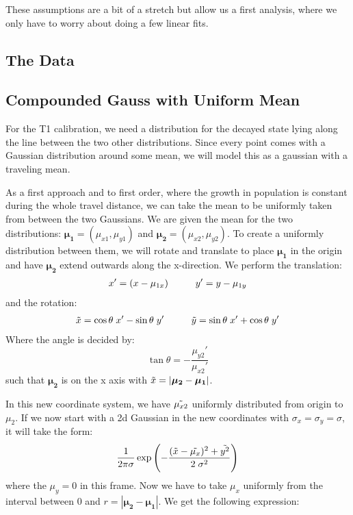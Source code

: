 These assumptions are a bit of a stretch but allow us a first analysis, where we only have to worry about doing a few linear fits.

\subsection{The Data}



\subsection{Compounded Gauss with Uniform Mean}
For the T1 calibration, we need a distribution for the decayed state lying along the line between the two other distributions. Since every point comes with a Gaussian distribution around some mean, we will model this as a gaussian with a traveling mean.

As a first approach and to first order, where the growth in population is constant during the whole travel distance, we can take the mean to be uniformly taken from between the two Gaussians. We are given the mean for the two distributions: $\boldsymbol{\mu_1} = (\mu_{x1}, \mu_{y1})$ and $\boldsymbol{\mu_2} = (\mu_{x2}, \mu_{y2})$. To create a uniformly distribution between them, we will rotate and translate to place $\boldsymbol{\mu_1}$ in the origin and have $\boldsymbol{\mu_2}$ extend outwards along the x-direction. We perform the translation:
\begin{align*}
    x' = (x - \mu_{1x}) \hspace{1 cm} y' = y - \mu_{1y}
\end{align*}
and the rotation:
\begin{align*}
    \Tilde{x} = \cos\theta \; x' - \sin\theta \; y' \hspace{1cm} \Tilde{y} =  \sin\theta \; x' + \cos\theta \; y' 
\end{align*}
Where the angle is decided by:
\begin{equation}
    \tan \theta = - \frac{\mu_{y2}'}{\mu_{x2}'} 
\end{equation}
such that  $\boldsymbol{\mu_{2}}$ is on the x axis with $\Tilde{x} = |\boldsymbol{\mu_{2}} - \boldsymbol{\mu_{1}}|$.

In this new coordinate system, we have $\Tilde{\mu_{x2}}$ uniformly distributed from origin to $\mu_2$. If we now start with a 2d Gaussian in the new coordinates with $\sigma_x = \sigma_y = \sigma$, it will take the form:
\begin{equation}
    \frac{1}{2 \pi \sigma} \exp \left(- \frac{(\Tilde{x} - \Tilde{\mu_x})^2 + \Tilde{y^2}}{2 \; \sigma^2} \right)
\end{equation}
where the $\mu_y = 0$ in this frame. Now we have to take $\mu_x$ uniformly from the interval between $0$ and $r = |\boldsymbol{\mu_{2}} - \boldsymbol{\mu_{1}}|$. We get the following expression:

